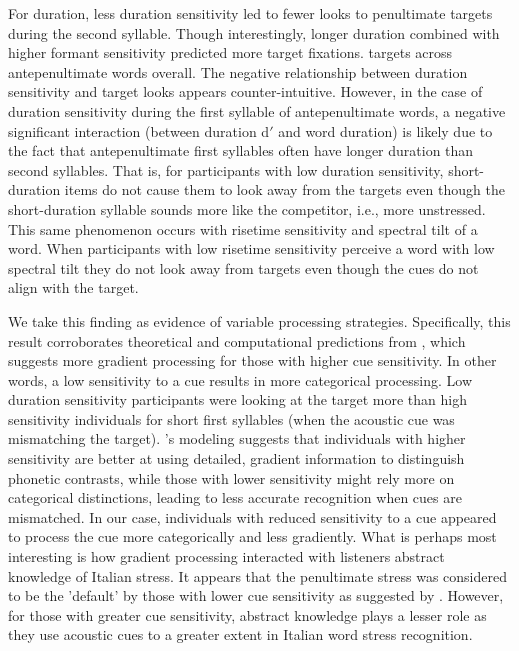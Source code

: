 For duration, less duration sensitivity led to fewer looks to penultimate targets during the second syllable. Though interestingly, longer duration combined with higher formant sensitivity predicted more target fixations. targets across antepenultimate words overall. The negative relationship between duration sensitivity and target looks appears counter-intuitive. However, in the case of duration sensitivity during the first syllable of antepenultimate words, a negative significant interaction (between duration d$'$ and word duration) is likely due to the fact that antepenultimate first syllables often have longer duration than second syllables. That is, for participants with low duration sensitivity, short-duration items do not cause them to look away from the targets even though the short-duration syllable sounds more like the competitor, i.e., more unstressed. This same phenomenon occurs with risetime sensitivity and spectral tilt of a word. When participants with low risetime sensitivity perceive a word with low spectral tilt they do not look away from targets even though the cues do not align with the target. 

We take this finding as evidence of variable processing strategies. Specifically, this result corroborates theoretical and computational predictions from \cite{mcmurray_2009}, which suggests more gradient processing for those with higher cue sensitivity. In other words, a low sensitivity to a cue results in more categorical processing. Low duration sensitivity participants were looking at the target more than high sensitivity individuals for short first syllables (when the acoustic cue was mismatching the target). \cite{mcmurray_2009}'s modeling suggests that individuals with higher sensitivity are better at using detailed, gradient information to distinguish phonetic contrasts, while those with lower sensitivity might rely more on categorical distinctions, leading to less accurate recognition when cues are mismatched. In our case, individuals with reduced sensitivity to a cue appeared to process the cue more categorically and less gradiently. What is perhaps most interesting is how gradient processing interacted with listeners abstract knowledge of Italian stress. It appears that the penultimate stress was considered to be the 'default' by those with lower cue sensitivity  as suggested by \cite{Sulpizio_McQueen_2012}. However, for those with greater cue sensitivity, abstract knowledge plays a lesser role as they use acoustic cues to a greater extent in Italian word stress recognition. 

